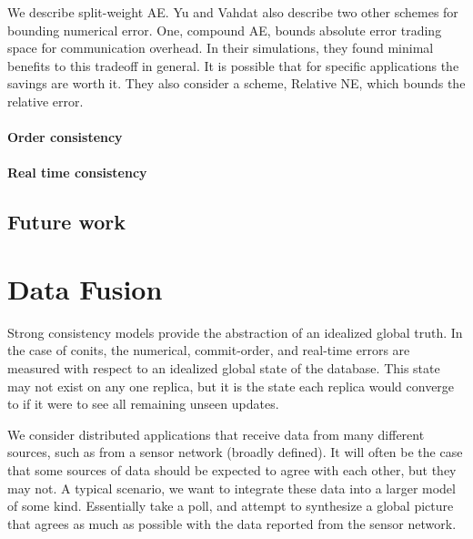 \documentclass[]             %
{NASA}                       %
\theoremstyle{definition}
\begin{document}
We describe split-weight AE. Yu and Vahdat also describe two other
schemes for bounding numerical error. One, compound AE, bounds absolute
error trading space for communication overhead. In their simulations,
they found minimal benefits to this tradeoff in general. It is possible
that for specific applications the savings are worth it. They also
consider a scheme, Relative NE, which bounds the relative error.

\hypertarget{order-consistency-1}{%
  \paragraph{Order consistency}\label{order-consistency-1}}

\hypertarget{real-time-consistency-1}{%
  \paragraph{Real time consistency}\label{real-time-consistency-1}}

\hypertarget{future-work}{%
  \subsection{Future work}\label{future-work}}

\hypertarget{data-fusion}{%
  \section{Data Fusion}\label{data-fusion}}

\cite{1999:lucien-datafusion}

\label{sec:data-fusion}

Strong consistency models provide the abstraction of an idealized global
truth. In the case of conits, the numerical, commit-order, and real-time
errors are measured with respect to an idealized global state of the
database. This state may not exist on any one replica, but it is the
state each replica would converge to if it were to see all remaining
unseen updates.

We consider distributed applications that receive data from many
different sources, such as from a sensor network (broadly defined). It
will often be the case that some sources of data should be expected to
agree with each other, but they may not. A typical scenario, we want to
integrate these data into a larger model of some kind. Essentially take
a poll, and attempt to synthesize a global picture that agrees as much
as possible with the data reported from the sensor network.
\end{document}
